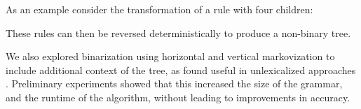 \documentclass[11pt,letterpaper]{article}
\newcommand{\nonterms}{\mathcal{N}}
\newcommand{\Rule}[3]{#1 \rightarrow #2\ #3}
\newcommand{\RuleA}[3]{#1 \rightarrow #2^*\ #3}
\newcommand{\lpkcomment}[1]{\textcolor{red}{\bf \small [#1 --lpk]}}
\newcommand{\nascomment}[1]{\textcolor{blue}{\bf \small [#1 --nas]}}
\begin{document}


As an example consider the transformation of a rule with four children:

\begin{center}
\end{center}

\noindent These rules can then be reversed deterministically to produce a non-binary tree. 



We also explored binarization using horizontal and vertical
markovization to include additional context of the tree, as found
useful in unlexicalized approaches \cite{klein2003accurate}.
Preliminary experiments showed that this increased the size of the
grammar, and the runtime of the algorithm, without leading to
improvements in accuracy.
\end{document}
